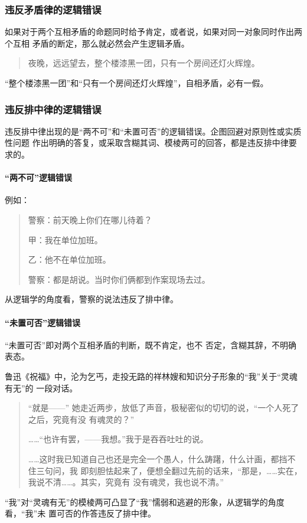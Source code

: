 \documentclass[final,oneside]{ctexbook}
\newenvironment{equotation}{\begin{quotation}\kaishu}{\end{quotation}}
\begin{document}
\subsubsection{违反矛盾律的逻辑错误}

如果对于两个互相矛盾的命题同时给予肯定，或者说，如果对同一对象同时作出两个互相
矛盾的断定，那么就必然会产生逻辑矛盾。
\begin{equotation}
  夜晚，远远望去，整个楼漆黑一团，只有一个房间还灯火辉煌。
\end{equotation}
“整个楼漆黑一团”和“只有一个房间还灯火辉煌”，自相矛盾，必有一假。

\subsubsection{违反排中律的逻辑错误}

违反排中律出现的是“两不可”和“未置可否”的逻辑错误。企图回避对原则性或实质性问题
作出明确的答复，或采取含糊其词、模棱两可的回答，都是违反排中律要求的。

\paragraph{“两不可”逻辑错误}例如：
\begin{equotation}
  警察：前天晚上你们在哪儿待着？

  甲：我在单位加班。

  乙：他不在单位加班。

  警察：都是胡说。当时你们俩都到作案现场去过。
\end{equotation}
从逻辑学的角度看，警察的说法违反了排中律。

\paragraph{“未置可否”逻辑错误}“未置可否”即对两个互相矛盾的判断，既不肯定，也不
否定，含糊其辞，不明确表态。

鲁迅《祝福》中，沦为乞丐，走投无路的祥林嫂和知识分子形象的“我”关于“灵魂有无”的
一段对话。
\begin{equotation}
  “就是——” 她走近两步，放低了声音，极秘密似的切切的说，“一个人死了之后，究竟有没
  有魂灵的？”

  ……“也许有罢，——我想。”我于是吞吞吐吐的说。

  ……这时我已知道自己也还是完全一个愚人，什么踌躇，什么计画，都挡不住三句问，我
  即刻胆怯起来了，便想全翻过先前的话来，“那是，……实在，我说不清……。其实，究竟有
  没有魂灵，我也说不清。”
\end{equotation}
“我”对“灵魂有无”的模棱两可凸显了“我”懦弱和逃避的形象，从逻辑学的角度看，“我”未
置可否的作答违反了排中律。
\end{document}
